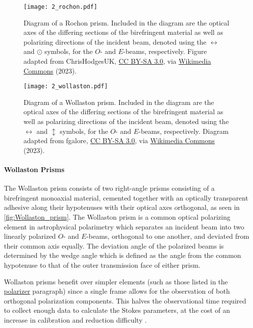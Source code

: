 \begin{figure}[t]
    \centering
    \texttt{[image: 2\_rochon.pdf]}
    \caption{
        Diagram of a Rochon prism.
        Included in the diagram are the optical axes of the differing sections of the birefringent material as well as polarizing directions of the incident beam, denoted using the $\leftrightarrow$ and $\odot$ symbols, for the $O$- and $E$-beams, respectively.
        Figure adapted from ChrisHodgesUK, \protect\href{https://creativecommons.org/licenses/by-sa/3.0/}{CC BY-SA 3.0}, via \protect\href{https://commons.wikimedia.org/wiki/File:Rochon_Prism.svg}{Wikimedia Commons} (2023).
    }
    \label{fig:Rochon_prism}
\end{figure}

\begin{figure}[t]
    \centering
    \texttt{[image: 2\_wollaston.pdf]}
    \caption{
        Diagram of a Wollaston prism.
        Included in the diagram are the optical axes of the differing sections of the birefringent material as well as polarizing directions of the incident beam, denoted using the $\leftrightarrow$ and $\updownarrow$ symbols, for the $O$- and $E$-beams, respectively.
        Diagram adapted from fgalore, \protect\href{https://creativecommons.org/licenses/by-sa/3.0/}{CC BY-SA 3.0}, via \protect\href{https://commons.wikimedia.org/wiki/File:Wollaston-prism.svg}{Wikimedia Commons} (2023).
    }
    \label{fig:Wollaston_prism}
\end{figure}

\paragraph{Wollaston Prisms} \label{par:wollaston}
The Wollaston prism consists of two right-angle prisms consisting of a birefringent monoaxial material, cemented together with an optically transparent adhesive along their hypotenuses with their optical axes orthogonal, as seen in \autoref{fig:Wollaston_prism}.
The Wollaston prism is a common optical polarizing element in astrophysical polarimetry which separates an incident beam into two linearly polarized $O$- and $E$-beams, orthogonal to one another, and deviated from their common axis equally.
The deviation angle of the polarized beams is determined by the wedge angle which is defined as the angle from the common hypotenuse to that of the outer transmission face of either prism.

Wollaston prisms benefit over simpler elements (such as those listed in the \hyperref[par:polarizer]{polarizer} paragraph) since a single frame allows for the observation of both orthogonal polarization components.
This halves the observational time required to collect enough data to calculate the Stokes parameters, at the cost of an increase in calibration and reduction difficulty \citep{wollaston}.

